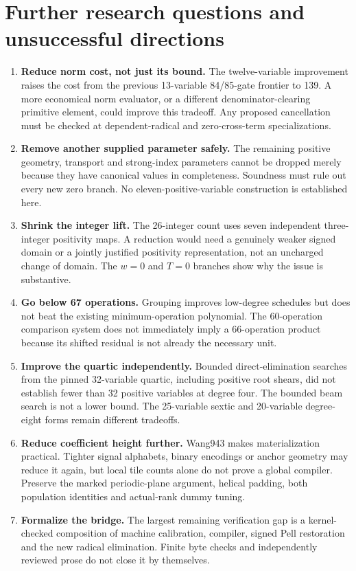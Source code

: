 \documentclass[11pt]{article}
\begin{document}
\section{Further research questions and unsuccessful directions}

\begin{enumerate}
\item \textbf{Reduce norm cost, not just its bound.} The twelve-variable improvement raises the cost from the previous 13-variable 84/85-gate frontier to 139. A more economical norm evaluator, or a different denominator-clearing primitive element, could improve this tradeoff. Any proposed cancellation must be checked at dependent-radical and zero-cross-term specializations.
\item \textbf{Remove another supplied parameter safely.} The remaining positive geometry, transport and strong-index parameters cannot be dropped merely because they have canonical values in completeness. Soundness must rule out every new zero branch. No eleven-positive-variable construction is established here.
\item \textbf{Shrink the integer lift.} The 26-integer count uses seven independent three-integer positivity maps. A reduction would need a genuinely weaker signed domain or a jointly justified positivity representation, not an uncharged change of domain. The $w=0$ and $T=0$ branches show why the issue is substantive.
\item \textbf{Go below 67 operations.} Grouping improves low-degree schedules but does not beat the existing minimum-operation polynomial. The 60-operation comparison system does not immediately imply a 66-operation product because its shifted residual is not already the necessary unit.
\item \textbf{Improve the quartic independently.} Bounded direct-elimination searches from the pinned 32-variable quartic, including positive root shears, did not establish fewer than 32 positive variables at degree four. The bounded beam search is not a lower bound. The 25-variable sextic and 20-variable degree-eight forms remain different tradeoffs.
\item \textbf{Reduce coefficient height further.} Wang943 makes materialization practical. Tighter signal alphabets, binary encodings or anchor geometry may reduce it again, but local tile counts alone do not prove a global compiler. Preserve the marked periodic-plane argument, helical padding, both population identities and actual-rank dummy tuning.
\item \textbf{Formalize the bridge.} The largest remaining verification gap is a kernel-checked composition of machine calibration, compiler, signed Pell restoration and the new radical elimination. Finite byte checks and independently reviewed prose do not close it by themselves.
\end{enumerate}
\end{document}
